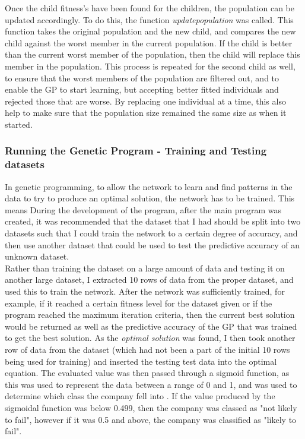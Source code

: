 \documentclass[11pt]{article}
\begin{document}
Once the child fitness's have been found for the children, the population can be updated accordingly. To do this, the function \textit{update\textunderscore population} was called. This function takes the original population and the new child, and compares the new child against the worst member in the current population. If the child is better than the current worst member of the population, then the child will replace this member in the population. This process is repeated for the second child as well, to ensure that the worst members of the population are filtered out, and to enable the GP to start learning, but accepting better fitted individuals and rejected those that are worse. By replacing one individual at a time, this also help to make sure that the population size remained the same size as when it started. 

\subsubsection{Running the Genetic Program - Training and Testing datasets}
In genetic programming, to allow the network to learn and find patterns in the data to try to produce an optimal solution, the network has to be trained. This means 
During the development of the program, after the main program was created, it was recommended that the dataset that I had should be split into two datasets such that I could train the network to a certain degree of accuracy, and then use another dataset that could be used to test the predictive accuracy of an unknown dataset. \\
Rather than training the dataset on a large amount of data and testing it on another large dataset, I extracted 10 rows of data from the proper dataset, and used this to train the network. After the network was sufficiently trained, for example, if it reached a certain fitness level for the dataset given or if the program reached the maximum iteration criteria, then the current best solution would be returned as well as the predictive accuracy of the GP that was trained to get the best solution.  As the \textit{optimal solution} was found, I then took another row of data from the dataset (which had not been a part of the initial 10 rows being used for training) and inserted the testing test data into the optimal equation. The evaluated value was then passed through a sigmoid function, as this was used to represent the data between a range of 0 and 1, and was used to determine which class the company fell into . If the value produced by the sigmoidal function was below 0.499, then the company was classed as "not likely to fail", however if it was 0.5 and above, the company was classified as "likely to fail".
\newpage
\end{document}

